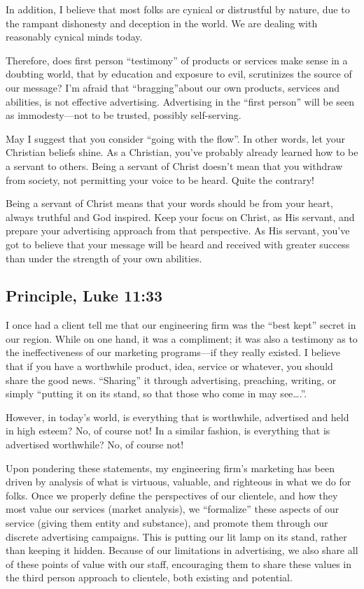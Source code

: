 \documentclass[12pt]{memoir}
\begin{document}
In addition, I believe that most folks are cynical or distrustful
by nature, due to the rampant dishonesty and deception in the world.
We are dealing with reasonably cynical minds today. 

Therefore, does first person ``testimony'' of products or services
make sense in a doubting world, that by education and exposure to
evil, scrutinizes the source of our message? I'm afraid that ``bragging''about
our own products, services and abilities, is not effective advertising.
Advertising in the ``first person'' will be seen as immodesty---not
to be trusted, possibly self-serving. 

May I suggest that you consider ``going with the flow''. In other
words, let your Christian beliefs shine. As a Christian, you've probably
already learned how to be a servant to others. Being a servant of
Christ doesn't mean that you withdraw from society, not permitting
your voice to be heard. Quite the contrary! 

Being a servant of Christ means that your words should be from your
heart, always truthful and God inspired. Keep your focus on Christ,
as His servant, and prepare your advertising approach from that perspective.
As His servant, you've got to believe that your message will be heard
and received with greater success than under the strength of your
own abilities.

\subsection{Principle, Luke 11:33}

I once had a client tell me that our engineering firm was the ``best
kept'' secret in our region. While on one hand, it was a compliment;
it was also a testimony as to the ineffectiveness of our marketing
programs---if they really existed. I believe that if you have a worthwhile
product, idea, service or whatever, you should share the good news.
``Sharing'' it through advertising, preaching, writing, or simply
``putting it on its stand, so that those who come in may see\dots  .''. 

However, in today's world, is everything that is worthwhile, advertised
and held in high esteem? No, of course not! In a similar fashion,
is everything that is advertised worthwhile? No, of course not!

Upon pondering these statements, my engineering firm's marketing has
been driven by analysis of what is virtuous, valuable, and righteous
in what we do for folks. Once we properly define the perspectives
of our clientele, and how they most value our services (market analysis),
we ``formalize'' these aspects of our service (giving them entity
and substance), and promote them through our discrete advertising
campaigns. This is putting our lit lamp on its stand, rather than
keeping it hidden. Because of our limitations in advertising, we also
share all of these points of value with our staff, encouraging them
to share these values in the third person approach to clientele, both
existing and potential. 
\end{document}
